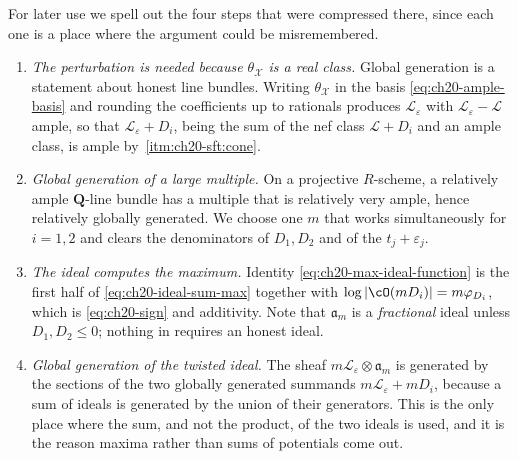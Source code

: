 For later use we spell out the four steps that were compressed there, since
each one is a place where the argument could be misremembered.

\begin{enumerate}
\item \emph{The perturbation is needed because \(\theta_{\mathcal X}\) is a
 real class.}  Global generation is a statement about honest line bundles.
 Writing \(\theta_{\mathcal X}\) in the basis \eqref{eq:ch20-ample-basis}
 and rounding the coefficients up to rationals produces
 \(\mathcal L_\varepsilon\) with \(\mathcal L_\varepsilon-\mathcal L\)
 ample, so that \(\mathcal L_\varepsilon+D_i\), being the sum of the nef
 class \(\mathcal L+D_i\) and an ample class, is ample by
 \,\cref{itm:ch20-sft:cone}.
\item \emph{Global generation of a large multiple.}  On a projective
 \(R\)-scheme, a relatively ample \(\mathbf Q\)-line bundle has a multiple
 that is relatively very ample, hence relatively globally generated.  We
 choose one \(m\) that works simultaneously for \(i=1,2\) and clears the
 denominators of \(D_1,D_2\) and of the \(t_j+\varepsilon_j\).
\item \emph{The ideal computes the maximum.}  Identity
 \eqref{eq:ch20-max-ideal-function} is the first half of
 \eqref{eq:ch20-ideal-sum-max} together with
 \(\log|\cO(mD_i)|=m\varphi_{D_i}\), which is
 \eqref{eq:ch20-sign} and additivity.  Note that
 \(\mathfrak a_m\) is a \emph{fractional} ideal unless \(D_1,D_2\leq0\);
 nothing in  requires an honest ideal.
\item \emph{Global generation of the twisted ideal.}  The sheaf
 \(m\mathcal L_\varepsilon\otimes\mathfrak a_m\) is generated by the
 sections of the two globally generated summands
 \(m\mathcal L_\varepsilon+mD_i\), because a sum of ideals is generated by
 the union of their generators.  This is the only place where the sum, and
 not the product, of the two ideals is used, and it is the reason maxima
 rather than sums of potentials come out.
\end{enumerate}

